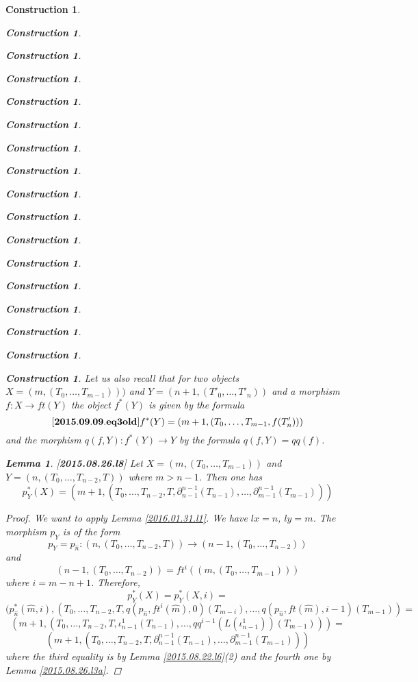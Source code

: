 \documentclass[12pt]{amsart}
\newenvironment{eq}{\begin{equation}}{\end{equation}}
\newtheorem{lemma}[proposition]{Lemma}
\newtheorem{construction}[proposition]{Construction}
\newcommand{\llabel}[1]{\label{#1}[{\bf #1}]}
\newcommand{\sr}{\rightarrow}
\newcommand{\wh}{\widehat}
\begin{document}
\begin{construction}
\begin{construction}
\begin{construction}
\begin{construction}
\begin{construction}
\begin{construction}
\begin{construction}
\begin{construction}
\begin{construction}
\begin{construction}
\begin{construction}
\begin{construction}
\begin{construction}
\begin{construction}
\begin{construction}
\begin{construction}
\begin{construction}
Let us also recall that for two objects $X=(m,(T_0,\dots,T_{m-1})))$ and $Y=(n+1,(T'_0,\dots,T'_{n}))$ and a morphism $f:X\sr ft(Y)$ the object $f^*(Y)$ is given by the formula
%
\begin{eq}\llabel{2015.09.09.eq3old}
f^*(Y)=(m+1,(T_0,\dots,T_{m-1},f(T'_{n})))
\end{eq}
%
and the morphism $q(f,Y):f^*(Y)\sr Y$ by the formula $q(f,Y)=qq(f)$. 
% 
\begin{lemma}
\llabel{2015.08.26.l8}
Let $X=(m,(T_0,\dots,T_{m-1}))$ and $Y=(n,(T_0,\dots,T_{n-2},T))$ where $m>n-1$. Then one has
%
$$p_{Y}^*(X)=(m+1,(T_0,\dots,T_{n-2},T,\partial_{n-1}^{n-1}(T_{n-1}),\dots,\partial_{m-1}^{n-1}(T_{m-1})))$$
%
\end{lemma}
%
\begin{proof}
We want to apply Lemma \ref{2016.01.31.l1}. We have $lx=n$, $ly=m$. The morphism $p_Y$ is of the form
%
$$p_Y=p_{\wh{n}}:(n,(T_0,\dots,T_{n-2},T))\sr (n-1,(T_0,\dots,T_{n-2}))$$
%
and 
%
$$(n-1,(T_0,\dots,T_{n-2}))=ft^i((m,(T_0,\dots,T_{m-1})))$$
%
where $i=m-n+1$. Therefore, 
%
$$p_Y^*(X)=p_Y^*(X,i)=$$$$(p_{\wh{n}}^*(\wh{m},i), (T_0,\dots,T_{n-2},T,q(p_{\wh{n}},ft^i(\wh{m}),0)(T_{m-i}),\dots,q(p_{\wh{n}},ft(\wh{m}),i-1)(T_{m-1}))=$$
$$(m+1,(T_0,\dots,T_{n-2},T,\iota_{n-1}^1(T_{n-1}),\dots,qq^{i-1}(L(\iota_{n-1}^1))(T_{m-1})))=$$
$$(m+1,(T_0,\dots,T_{n-2},T,\partial_{n-1}^{n-1}(T_{n-1}),\dots,\partial_{m-1}^{n-1}(T_{m-1})))$$
%
where the third equality is by Lemma \ref{2015.08.22.l6}(2) and the fourth one by Lemma \ref{2015.08.26.l3a}. 
\end{proof}
%



\end{construction}
\end{construction}
\end{construction}
\end{construction}
\end{construction}
\end{construction}
\end{construction}
\end{construction}
\end{construction}
\end{construction}
\end{construction}
\end{construction}
\end{construction}
\end{construction}
\end{construction}
\end{construction}
\end{construction}
\end{document}
